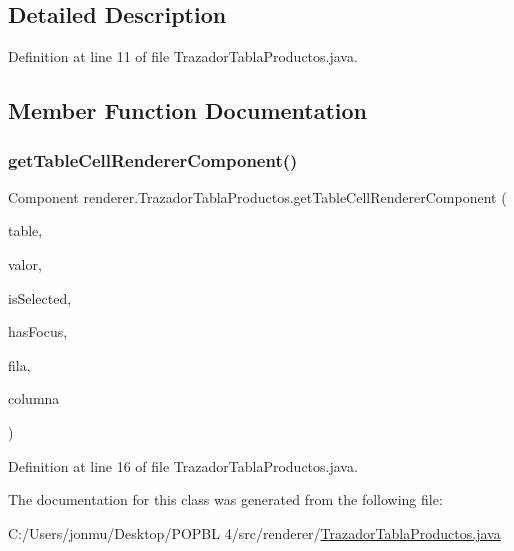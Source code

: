 \subsection{Detailed Description}


Definition at line 11 of file Trazador\+Tabla\+Productos.\+java.



\subsection{Member Function Documentation}
\mbox{\label{classrenderer_1_1_trazador_tabla_productos_a0d15ae9262431f81b66258d7f445092c}} 
\subsubsection{\texorpdfstring{get\+Table\+Cell\+Renderer\+Component()}{getTableCellRendererComponent()}}
{\footnotesize\ttfamily Component renderer.\+Trazador\+Tabla\+Productos.\+get\+Table\+Cell\+Renderer\+Component (\begin{DoxyParamCaption}\item[{J\+Table}]{table,  }\item[{Object}]{valor,  }\item[{boolean}]{is\+Selected,  }\item[{boolean}]{has\+Focus,  }\item[{int}]{fila,  }\item[{int}]{columna }\end{DoxyParamCaption})}



Definition at line 16 of file Trazador\+Tabla\+Productos.\+java.



The documentation for this class was generated from the following file\+:\begin{DoxyCompactItemize}
\item 
C\+:/\+Users/jonmu/\+Desktop/\+P\+O\+P\+B\+L 4/src/renderer/\mbox{\hyperlink{_trazador_tabla_productos_8java}{Trazador\+Tabla\+Productos.\+java}}\end{DoxyCompactItemize}
